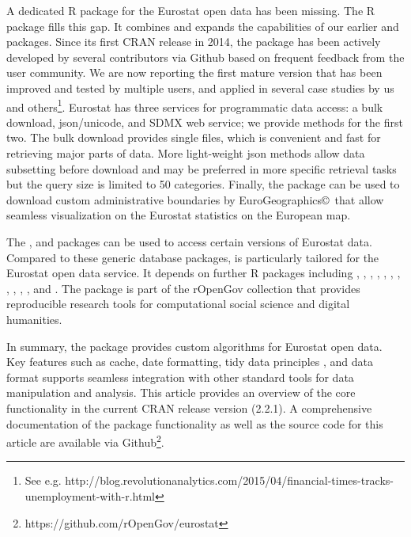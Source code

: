 A dedicated R package for the Eurostat open data has been
missing. The  R package fills this gap. It combines
and expands the capabilities of our
earlier  \citep{statfi}
and  \citep{smarterpoland} packages. Since its
first CRAN release in 2014, the  package has been
actively developed by several contributors via Github based on
frequent feedback from the user community. We are now reporting the
first mature version that has been improved and tested by multiple
users, and applied in several case studies by us and
others\footnote{See
e.g. http://blog.revolutionanalytics.com/2015/04/financial-times-tracks-unemployment-with-r.html}. Eurostat
has three services for programmatic data access: a bulk download,
json/unicode, and SDMX web service; we provide methods for the first
two. The bulk download provides single files, which is convenient and
fast for retrieving major parts of data. More light-weight json
methods allow data subsetting before download and may be preferred in
more specific retrieval tasks but the query size is limited to 50
categories. Finally, the package can be used to download custom
administrative boundaries by EuroGeographics\copyright \ that allow
seamless visualization on the Eurostat statistics on the European map.

The  \citep{datamart},  \citep{quandl} and
 \citep{pdfetch} 
packages can be used to access certain versions of Eurostat
data. Compared to these generic database packages, 
is particularly tailored for the Eurostat open data service. It
depends on further R packages including
 \citep{classInt},
 \citep{dplyr},
 \citep{httr},
 \citep{jsonlite},
 \citep{knitr},
 \citep{ggplot2},
 \citep{mapproj}, 
 \citep{RColorBrewer},
 \citep{readr},
 \citep{sp},
 \citep{stringi}, and
 \citep{stringr}. The  package is part of the rOpenGov collection
\citep{Lahti13icml} that provides reproducible research tools for
computational social science and digital humanities.

In summary, the  package provides custom algorithms
for Eurostat open data. Key features such as cache, date formatting,
tidy data principles \citep{wickham2014},
and  \citep{tibble} data format supports seamless
integration with other standard tools for data manipulation and
analysis. This article provides an overview of the core functionality
in the current CRAN release version (2.2.1). A comprehensive
documentation of the package functionality as well as the source code
for this article are available via
Github\footnote{https://github.com/rOpenGov/eurostat}.



